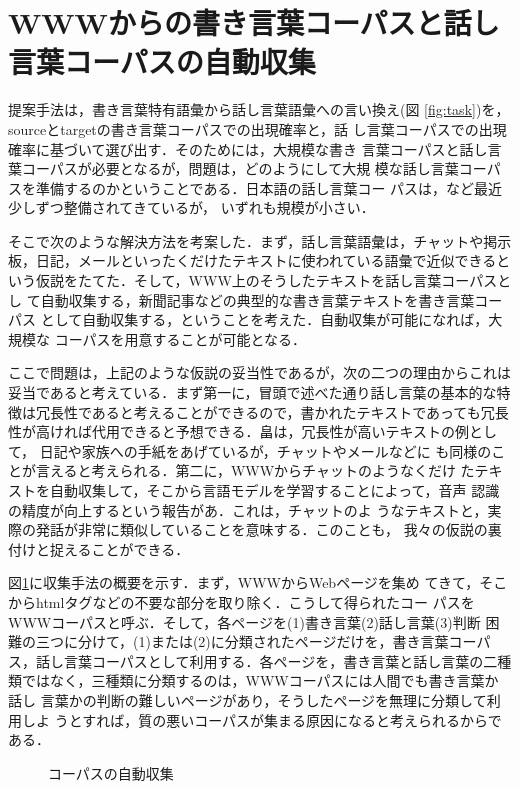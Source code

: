 \documentclass{nlp}
\begin{document}
\section{WWWからの書き言葉コーパスと話し言葉コーパスの自動収集}
提案手法は，書き言葉特有語彙から話し言葉語彙への言い換え(図
\ref{fig:task})を，sourceとtargetの書き言葉コーパスでの出現確率と，話
し言葉コーパスでの出現確率に基づいて選び出す．そのためには，大規模な書き
言葉コーパスと話し言葉コーパスが必要となるが，問題は，どのようにして大規
模な話し言葉コーパスを準備するのかということである．日本語の話し言葉コー
パスは，\cite{Maekawa00,Takezawa02}など最近少しずつ整備されてきているが，
いずれも規模が小さい．

そこで次のような解決方法を考案した．まず，話し言葉語彙は，チャットや掲示
板，日記，メールといったくだけたテキストに使われている語彙で近似できると
いう仮説をたてた．そして，WWW上のそうしたテキストを話し言葉コーパスとし
て自動収集する，新聞記事などの典型的な書き言葉テキストを書き言葉コーパス
として自動収集する，ということを考えた．自動収集が可能になれば，大規模な
コーパスを用意することが可能となる．

ここで問題は，上記のような仮説の妥当性であるが，次の二つの理由からこれは
妥当であると考えている．まず第一に，冒頭で述べた通り話し言葉の基本的な特
徴は冗長性であると考えることができるので，書かれたテキストであっても冗長
性が高ければ代用できると予想できる．畠は，冗長性が高いテキストの例として，
日記や家族への手紙をあげているが\cite{Hatake87}，チャットやメールなどに
も同様のことが言えると考えられる．第二に，WWWからチャットのようなくだけ
たテキストを自動収集して，そこから言語モデルを学習することによって，音声
認識の精度が向上するという報告があ\cite{Bulyko03}．これは，チャットのよ
うなテキストと，実際の発話が非常に類似していることを意味する．このことも，
我々の仮説の裏付けと捉えることができる．

図\ref{fig:collect}に収集手法の概要を示す．まず，WWWからWebページを集め
てきて，そこからhtmlタグなどの不要な部分を取り除く．こうして得られたコー
パスをWWWコーパスと呼ぶ．そして，各ページを(1)書き言葉(2)話し言葉(3)判断
困難の三つに分けて，(1)または(2)に分類されたページだけを，書き言葉コーパ
ス，話し言葉コーパスとして利用する．各ページを，書き言葉と話し言葉の二種
類ではなく，三種類に分類するのは，WWWコーパスには人間でも書き言葉か話し
言葉かの判断の難しいページがあり，そうしたページを無理に分類して利用しよ
うとすれば，質の悪いコーパスが集まる原因になると考えられるからである．

\begin{figure}[h]
 \begin{center}
 \end{center}
 \caption{コーパスの自動収集}
 \label{fig:collect}
\end{figure}
\end{document}
